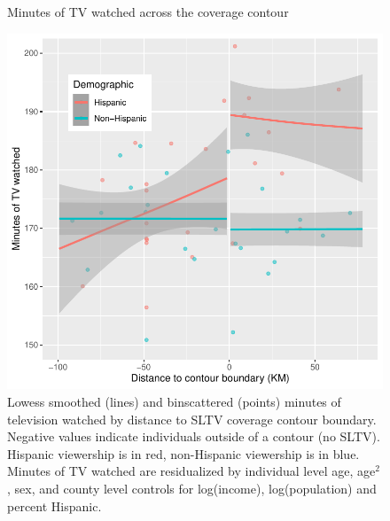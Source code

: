 \documentclass[11pt]{article}
\begin{document}
\begin{figure}[!hbtp]
\centering
\caption{Minutes of TV watched across the coverage contour}\label{f:atus}
\includegraphics[width=14.5cm]{../../analysis/Output/graphs/atus2.pdf}
\caption*{Lowess smoothed (lines) and binscattered (points) minutes of television watched by distance to SLTV coverage contour boundary. Negative values indicate individuals outside of a contour (no SLTV). Hispanic viewership is in red, non-Hispanic viewership is in blue. Minutes of TV watched are residualized by individual level age, age$^2$, sex, and county level controls for log(income), log(population) and percent Hispanic. }
\end{figure} 


\clearpage
\end{document}
